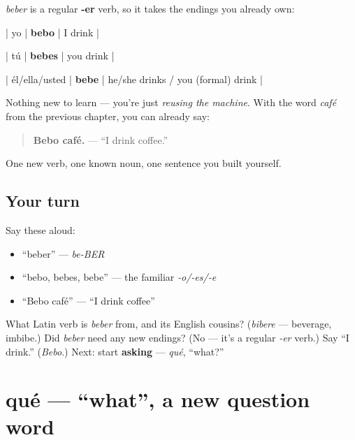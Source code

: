 \begin{grammarlens}[title={Grammar Lens: no new grammar — that's the point}]
\emph{beber} is a regular \textbf{-er} verb, so it takes the endings you already own:

| yo | \textbf{bebo} | I drink |

| tú | \textbf{bebes} | you drink |

| él/ella/usted | \textbf{bebe} | he/she drinks / you (formal) drink |

Nothing new to learn — you're just \emph{reusing the machine}. With the word \emph{café} from the previous chapter, you can already say:

\begin{quote}
\textbf{Bebo café.} — \textquotedblleft{}I drink coffee.\textquotedblright{}
\end{quote}

One new verb, one known noun, one sentence you built yourself.
\end{grammarlens}

\subsection*{Your turn}
Say these aloud:

\begin{itemize}
\raggedright
  \item \textquotedblleft{}beber\textquotedblright{} — \emph{be-BER}
  \item \textquotedblleft{}bebo, bebes, bebe\textquotedblright{} — the familiar \emph{-o/-es/-e}
  \item \textquotedblleft{}Bebo café\textquotedblright{} — \textquotedblleft{}I drink coffee\textquotedblright{}
\end{itemize}

\begin{tcolorbox}[breakable,colback=teal!4,colframe=teal!35!black,title={Before you move on}]
What Latin verb is \emph{beber} from, and its English cousins? (\emph{bibere} — beverage, imbibe.) Did \emph{beber} need any new endings? (No — it's a regular \emph{-er} verb.) Say \textquotedblleft{}I drink.\textquotedblright{} (\emph{Bebo}.) Next: start \textbf{asking} — \emph{qué}, \textquotedblleft{}what?\textquotedblright{}
\end{tcolorbox}
\section[qué]{qué — \textquotedblleft{}what\textquotedblright{}, a new question word}

